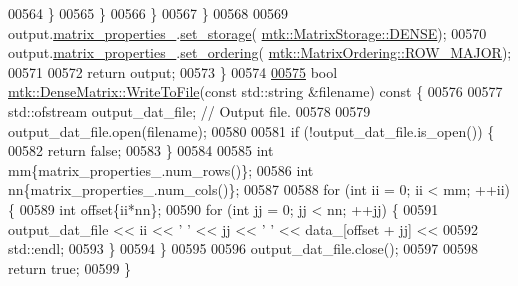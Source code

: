 \begin{DoxyCode}
00564         \}
00565       \}
00566     \}
00567   \}
00568 
00569   output.\hyperlink{classmtk_1_1DenseMatrix_a481c8d09af685a5ba67acefdcaa810cc}{matrix\_properties\_}.\hyperlink{classmtk_1_1Matrix_a111b89f2f21d06a59b8d043123bec625}{set\_storage}(
      \hyperlink{namespacemtk_ga25b67ec6a2afeee69f9bb196a9c66619a0706fbbd929bd8abc4de386c53d439ff}{mtk::MatrixStorage::DENSE});
00570   output.\hyperlink{classmtk_1_1DenseMatrix_a481c8d09af685a5ba67acefdcaa810cc}{matrix\_properties\_}.\hyperlink{classmtk_1_1Matrix_a8bdaf3f8307b00a36843359f165e1f17}{set\_ordering}(
      \hyperlink{namespacemtk_ga622801bd9f912d0f976c3e383f5f581ca21541962976d7709c26e9cd8385bd648}{mtk::MatrixOrdering::ROW\_MAJOR});
00571 
00572   \textcolor{keywordflow}{return} output;
00573 \}
00574 
\hypertarget{mtk__dense__matrix_8cc_source_l00575}{}\hyperlink{classmtk_1_1DenseMatrix_ab396804fb5f188e1eaa8578c738c59fc}{00575} \textcolor{keywordtype}{bool} \hyperlink{classmtk_1_1DenseMatrix_ab396804fb5f188e1eaa8578c738c59fc}{mtk::DenseMatrix::WriteToFile}(\textcolor{keyword}{const} std::string &filename)\textcolor{keyword}{ const }\{
00576 
00577   std::ofstream output\_dat\_file;  \textcolor{comment}{// Output file.}
00578 
00579   output\_dat\_file.open(filename);
00580 
00581   \textcolor{keywordflow}{if} (!output\_dat\_file.is\_open()) \{
00582     \textcolor{keywordflow}{return} \textcolor{keyword}{false};
00583   \}
00584 
00585   \textcolor{keywordtype}{int} mm\{matrix\_properties\_.num\_rows()\};
00586   \textcolor{keywordtype}{int} nn\{matrix\_properties\_.num\_cols()\};
00587 
00588   \textcolor{keywordflow}{for} (\textcolor{keywordtype}{int} ii = 0; ii < mm; ++ii) \{
00589     \textcolor{keywordtype}{int} offset\{ii*nn\};
00590     \textcolor{keywordflow}{for} (\textcolor{keywordtype}{int} jj = 0; jj < nn; ++jj) \{
00591       output\_dat\_file << ii << \textcolor{charliteral}{' '} << jj << \textcolor{charliteral}{' '} << data\_[offset + jj] <<
00592         std::endl;
00593     \}
00594   \}
00595 
00596   output\_dat\_file.close();
00597 
00598   \textcolor{keywordflow}{return} \textcolor{keyword}{true};
00599 \}
\end{DoxyCode}
